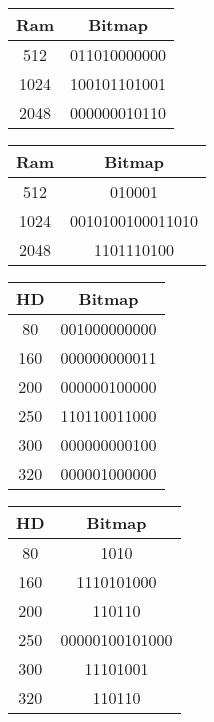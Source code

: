 \documentclass[12pt, letterpaper, fleqn]{article}
\begin{document}
  \begin{center}
  \begin{tabular}{ |c | c| }
    \hline
    Ram          & Bitmap \\ \hline
    512          &  011010000000\\
    1024         &  100101101001\\
    2048         &  000000010110\\
    \hline
  \end{tabular}
  \end{center}
  \begin{center}
  \begin{tabular}{ |c | c| }
    \hline
    Ram          & Bitmap \\ \hline
    512          &  010001\\
    1024         &  0010100100011010\\
    2048         &  1101110100\\
    \hline
  \end{tabular}
  \end{center}

  \begin{center}
  \begin{tabular}{ |c | c| }
    \hline
    HD           & Bitmap \\ \hline
    80           &  001000000000\\
    160          &  000000000011\\
    200          &  000000100000\\
    250          &  110110011000\\
    300          &  000000000100\\
    320          &  000001000000\\
    \hline
  \end{tabular}
  \end{center}
  \begin{center}
  \begin{tabular}{ |c | c| }
    \hline
    HD           & Bitmap \\ \hline
    80           &  1010\\
    160          &  1110101000\\
    200          &  110110\\
    250          &  00000100101000\\
    300          &  11101001\\
    320          &  110110\\
    \hline
  \end{tabular}
  \end{center}
\end{document}
